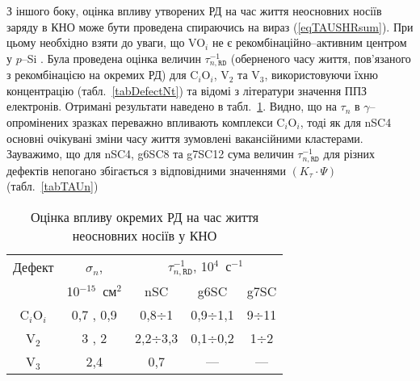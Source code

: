 З іншого боку,
оцінка впливу утворених РД на час життя неосновних носіїв заряду в КНО може бути проведена спираючись
на вираз (\ref{eqTAUSHRsum}).
При цьому необхідно взяти до уваги,
що VO$_i$ не є рекомбінаційно--активним центром у $p$--Si \cite{gamma:Kolkov,IrrCzpSi:Benton,IrrCzpSi:Coffa,IrrCzpSi:Ganagona,IrrCzpSi:Vines}.
Була проведена оцінка величин $\tau_{n,\mathtt{RD}}^{-1}$ (оберненого часу життя, пов'язаного з рекомбінацією на окремих РД)
для C$_i$O$_i$, V$_2$ та  V$_3$, використовуючи їхню концентрацію (табл.~\ref{tabDefectNt}) та відомі з літератури значення ППЗ електронів.
Отримані результати наведено в табл.~\ref{tabDefectTAU}.
Видно, що на $\tau_n$ в $\gamma$--опромінених зразках переважно впливають комплекси C$_i$O$_i$, тоді як для nSC4 основні очікувані
зміни часу життя зумовлені вакансійними кластерами.
Зауважимо, що для nSC4, g6SC8 та g7SC12 сума величин $\tau_{n,\mathtt{RD}}^{-1}$ для різних дефектів
непогано збігається з відповідними значеннями $(K_\tau\cdot\Psi)$ (табл.~\ref{tabTAUn})




\begin{table}[b]
\caption{\label{tabDefectTAU}Оцінка впливу окремих РД на час життя неосновних носіїв у КНО
}
\center
\begin{tabular}{|c|c|c|c|c|}
\hline
Дефект&$\sigma_n$,&\multicolumn{3}{c|}{$\tau_{n,\mathtt{RD}}^{-1}$, 10$^4$~с$^{-1}$}\\ \cline{3-5}
&10$^{-15}$~см$^2$&nSC&g6SC&g7SC\\
\hline
C$_i$O$_i$&0,7 \cite{gamma:Stahl}, 0,9 \cite{gamma:Kolkr}&0,8$\div$1&0,9$\div$1,1&9$\div$11\\ \hline
V$_2$&3 \cite{gamma:Stahl}, 2 \cite{A:Brothe}&2,2$\div$3,3&0,1$\div$0,2&1$\div$2\\ \hline
V$_3$&2,4 \cite{V3:Markevich}&0,7&---&---\\ \hline
\end{tabular}
\end{table}

